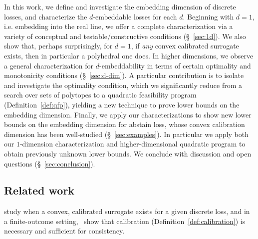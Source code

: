 \documentclass[final]{colt2020} %
\newcommand{\reals}{\mathbb{R}}
\begin{document}
In this work, we define and investigate the embedding dimension of discrete losses, and characterize the $d$-embeddable losses for each $d$.
Beginning with $d=1$, i.e. embedding into the real line, we offer a complete characterization via a variety of conceptual and testable/constructive conditions (\S~\ref{sec:1d}).
We also show that, perhaps surprisingly, for $d=1$, if \emph{any} convex calibrated surrogate exists, then in particular a polyhedral one does.
In higher dimensions, we observe a general characterization for $d$-embeddability in terms of certain optimality and monotonicity conditions (\S~\ref{sec:d-dim}).
A particular contribution is to isolate and investigate the optimality condition, which we significantly reduce from a search over sets of polytopes to a quadratic feasibility program (Definition~\ref{def:qfp}), yielding a new technique to prove lower bounds on the embedding dimension.
Finally, we apply our characterizations to show new lower bounds on the embedding dimension for abstain loss, whose convex calibration dimension has been well-studied \citep{ramaswamy2016convex, ramaswamy2018consistent} (\S~\ref{sec:examples}).
In particular we apply both our $1$-dimension characterization and higher-dimensional quadratic program to obtain previously unknown lower bounds.
We conclude with discussion and open questions (\S~\ref{sec:conclusion}).




\subsection{Related work}
\citet{zhang2004statistical,bartlett2006convexity} study when a convex, calibrated surrogate exists for a given discrete loss, and in a finite-outcome setting,~\citet{tewari2007consistency} show that calibration (Definition~\ref{def:calibration}) is necessary and sufficient for consistency.
\end{document}
